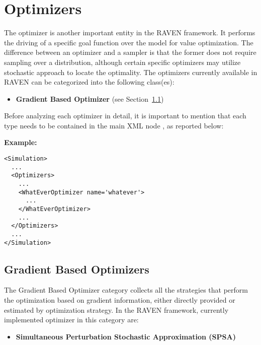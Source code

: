 \section{Optimizers}
\label{sec:Optimizers}

\renewcommand{\nameDescription}
{
  \xmlAttr{name},
  \xmlDesc{required string attribute}, user-defined name of this optimizer.
  \nb As with other objects, this identifier can be used to reference this
  specific entity from other input blocks in the XML.
}
\renewcommand{\specBlock}[2]
{
  The specifications of this optimizer must be defined within #1 \xmlNode{#2} XML
  block.
}


The optimizer is another important entity in the RAVEN framework. It performs the driving of a specific goal function over the model for value optimization. The difference between an optimizer and a sampler is that the former does not require sampling over a distribution, although certain specific optimizers may utilize stochastic approach to locate the optimality. 
The optimizers currently available in RAVEN can be categorized into the following class(es):
\begin{itemize}
\item \textbf{Gradient Based Optimizer} (see Section~\ref{subsec:gradientBasedOptimizers})
\end{itemize}

Before analyzing each optimizer in detail, it is important to mention that each type needs to be contained in the main XML node , as reported below:

\textbf{Example:}

\begin{lstlisting}[style=XML]
<Simulation>
  ...
  <Optimizers>
    ...
    <WhatEverOptimizer name='whatever'>
      ...
    </WhatEverOptimizer>
    ...
  </Optimizers>
  ...
</Simulation>
\end{lstlisting}

\subsection{Gradient Based Optimizers}
\label{subsec:gradientBasedOptimizers}
The Gradient Based Optimizer category collects all the strategies that perform the optimization based on gradient information, either directly provided or estimated by optimization strategy. In the RAVEN framework, currently implemented optimizer in this category are:
\begin{itemize}
\item \textbf{Simultaneous Perturbation Stochastic Approximation (SPSA)}
\end{itemize}


